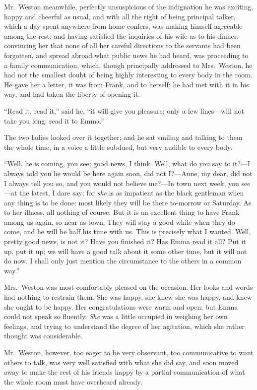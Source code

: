 Mr.\ Weston meanwhile, perfectly unsuspicious of the indignation
he was exciting, happy and cheerful as usual, and with all
the right of being principal talker, which a day spent anywhere
from home confers, was making himself agreeable among the rest;
and having satisfied the inquiries of his wife as to his dinner,
convincing her that none of all her careful directions to the servants
had been forgotten, and spread abroad what public news he had heard,
was proceeding to a family communication, which, though principally
addressed to Mrs.\ Weston, he had not the smallest doubt of being
highly interesting to every body in the room.  He gave her a letter,
it was from Frank, and to herself; he had met with it in his way,
and had taken the liberty of opening it.

``Read it, read it,'' said he, ``it will give you pleasure;
only a few lines---will not take you long; read it to Emma.''

The two ladies looked over it together; and he sat smiling
and talking to them the whole time, in a voice a little subdued,
but very audible to every body.

``Well, he is coming, you see; good news, I think.  Well, what do
you say to it?---I always told you he would be here again soon,
did not I?---Anne, my dear, did not I always tell you so, and you would
not believe me?---In town next week, you see---at the latest, I dare say;
for \emph{she} is as impatient as the black gentleman when any thing is
to be done; most likely they will be there to-morrow or Saturday.
As to her illness, all nothing of course.  But it is an excellent
thing to have Frank among us again, so near as town.  They will stay
a good while when they do come, and he will be half his time with us.
This is precisely what I wanted.  Well, pretty good news, is not it?
Have you finished it?  Has Emma read it all?  Put it up, put it up;
we will have a good talk about it some other time, but it will not
do now.  I shall only just mention the circumstance to the others in a
common way.''

Mrs.\ Weston was most comfortably pleased on the occasion.
Her looks and words had nothing to restrain them.  She was happy,
she knew she was happy, and knew she ought to be happy.
Her congratulations were warm and open; but Emma could not speak
so fluently.  \emph{She} was a little occupied in weighing her own feelings,
and trying to understand the degree of her agitation, which she
rather thought was considerable.

Mr.\ Weston, however, too eager to be very observant, too communicative
to want others to talk, was very well satisfied with what she did say,
and soon moved away to make the rest of his friends happy by a partial
communication of what the whole room must have overheard already.


